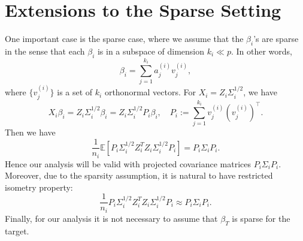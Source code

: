 \section{Extensions to the Sparse Setting}

One important case is the sparse case, where we assume that the $\beta_i$'s are sparse in the sense
that each $\beta_i$ is in a subspace of dimension $k_i\ll p$. In other words,
$$\beta_i = \sum_{j=1}^{k_i} a^{(i)}_j v^{(i)}_j,$$
where $\{v^{(i)}_j\}$ is a set of $k_i$ orthonormal vectors. For $X_i= Z_i \Sigma_i^{1/2}$, we have
$$ X_i \beta_i = Z_i \Sigma_i^{1/2}\beta_i=  Z_i \Sigma_i^{1/2}P_i\beta_i,\quad P_i:= \sum_{j=1}^{k_i}v_j^{(i)}(v_j^{(i)})^\top.$$
Then we have
$$\frac{1}{n_i}\mathbb E\left[P_i \Sigma_i^{1/2} Z_i^T Z_i \Sigma_i^{1/2}P_i\right]=P_i \Sigma_i P_i.$$
Hence our analysis will be valid with projected covariance matrices $P_i \Sigma_i P_i$. Moreover, due to the sparsity assumption, it is natural to have restricted isometry property:
$$\frac{1}{n_i} P_i \Sigma_i^{1/2} Z_i^T Z_i \Sigma_i^{1/2}P_i \approx P_i \Sigma_i P_i.$$
Finally, for our analysis it is not necessary to assume that $\beta_T$ is sparse for the target.

